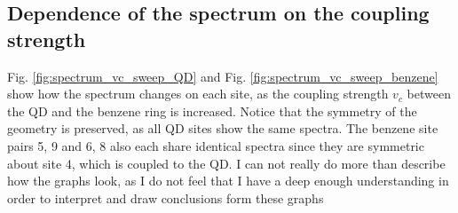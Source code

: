 \subsection{Dependence of the spectrum on the coupling strength}
Fig. \ref{fig:spectrum_vc_sweep_QD} and Fig. \ref{fig:spectrum_vc_sweep_benzene} show how the spectrum changes on each site, as the coupling strength $v_c$ between the QD and the benzene ring is increased. Notice that the symmetry of the geometry is preserved, as all QD sites show the same spectra. The benzene site pairs 5, 9 and 6, 8 also each share identical spectra since they are symmetric about site 4, which is coupled to the QD. \color{red} I can not really do more than describe how the graphs look, as I do not feel that I have a deep enough understanding in order to interpret and draw conclusions form these graphs\color{black}

